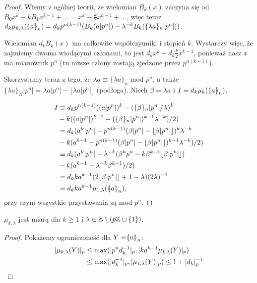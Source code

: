 \begin{proof}
	Wiemy z ogólnej teorii, że wielomian $B_k(x)$ zaczyna się od $B_0x^k + kB_1 x^{k-1} + \ldots = x^k - \frac k 2 x^{k-1} + \ldots$, więc teraz $d_k \mu_{k, \lambda} (\mathrel{\langle\mkern-3.85mu\mid\mkern-4mu} {a}\mathrel{\mkern-4mu\mid\mkern-3.85mu\rangle}_{n}) =  d_k p^{n(k-1)} (B_k(a|p^n| ) - \lambda^{-k} B_k(\{\lambda a\}_n |p^n|))$.
	
	Wielomian $d_kB_k(x)$ ma całkowite współczynniki i stopień $k$.
	Wystarczy więc, że zajmiemy dwoma wiodącymi członami, to jest $d_k x^k - d_k \frac k 2 x^{k-1}$, ponieważ nasz $x$ ma mianownik $p^n$ (tu niższe człony zostają zjedzone przez $p^{n(k-1)}$).

	Skorzystamy teraz z tego, że $\lambda a \equiv \{\lambda a\}_n$ mod $p^n$, a także $\{\lambda a\}_N |p^n| = \lambda a |p^n| - \lfloor \lambda a |p^n| \rfloor$ (podłoga).
	Niech $\beta = \lambda a$ i $I = d_k\mu_k(\mathrel{\langle\mkern-3.85mu\mid\mkern-4mu} {a}\mathrel{\mkern-4mu\mid\mkern-3.85mu\rangle}_{n})$.

	\begin{align*}
	I & \equiv d_kp^{n(k-1)} ((a|p^n|)^k - (\{\beta\}_n |p^n|  / \lambda)^k \\
	  & - k ((a|p^n|)^{k-1} -  (\{\beta\}_n |p^n|)^{k-1} \lambda^{-k})/ 2)  \\
	  & = d_k (a^k |p^n| - p^{n(k-1)} (\beta |p^n| - \lfloor \beta |p^n|\rfloor)^k \lambda^{-k} \\
	  & - k (a^{k-1} - p^{n(k-1)} (\beta |p^n| - \lfloor \beta |p^n|\rfloor)^{k-1}\lambda^{-k})/2)  \\
	  & \equiv d_k (a^k|p^n| - \lambda^{-k}(\beta^k p^{n} - k\beta^{k-1} \lfloor \beta |p^n|\rfloor) \\
	  & - k (a^{k-1} - \lambda^{-k} \beta^{k-1})/2) \\
	  & = d_k k a^{k-1} (2 \lfloor \beta|p^n|\rfloor + 1 - \lambda)(2\lambda)^{-1}\\
	  & = d_k k a^{k-1} \mu_{1, \lambda} (\mathrel{\langle\mkern-3.85mu\mid\mkern-4mu} {a}\mathrel{\mkern-4mu\mid\mkern-3.85mu\rangle}_{n}),
	\end{align*}
	przy czym wszystkie przystawania są mod $p^n$.
\end{proof}

\begin{wniosek}
	$\mu_{k, \lambda}$ jest miarą dla $k \ge 1$ i $\lambda \in \mathbb Z \setminus (p\mathbb Z \cup \{1\})$.
\end{wniosek}

\begin{proof}
	Pokażemy ograniczoność dla $Y = \mathrel{\langle\mkern-3.85mu\mid\mkern-4mu} {a}\mathrel{\mkern-4mu\mid\mkern-3.85mu\rangle}_{n}$:
	\begin{align*}
		|\mu_{k, \lambda}(Y)|_p & \le \max (|p^nd_k^{-1}|_p, |k a^{k-1} \mu_{1, \lambda}(Y)|_p ) \\
		& \le \max (|d_k^{-1}|_p, |\mu_{1, \lambda}(Y)|_p) \le 1 + |d_k|_p^{-1} \qedhere
	\end{align*}
\end{proof}


